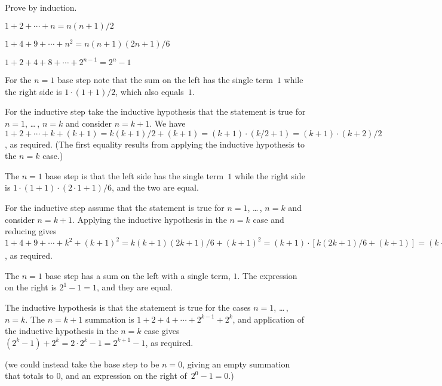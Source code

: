 \documentclass{ibl}
\begin{document}
\begin{ex}
Prove by induction.
\begin{exes}
\item $1+2+\cdots+n=n(n+1)/2$
\item $1+4+9+\cdots+n^2=n(n+1)(2n+1)/6$
\item $1+2+4+8+\cdots+2^{n-1}=2^n-1$
\end{exes}
\begin{ans}
\begin{exes}
\item For the $n=1$ base step note that the sum on the left
  has the single term~$1$
  while the right side is $1\cdot(1+1)/2$, which also equals~$1$.

  For the inductive step take the inductive hypothesis 
  that the statement is true for $n=1$, 
  \ldots\,, $n=k$ and consider $n=k+1$.
  We have 
  $1+2+\cdots+k+(k+1)=k(k+1)/2+(k+1)=(k+1)\cdot(k/2+1)=(k+1)\cdot(k+2)/2$, 
  as required.  
  (The first equality results from applying the inductive hypothesis to 
  the $n=k$ case.) 
\item The $n=1$ base step is that the left side has the single term~$1$
  while the right side is $1\cdot(1+1)\cdot(2\cdot 1+1)/6$, and the 
  two are equal.

  For the inductive step assume that the statement is true for 
  $n=1$, \ldots\,, $n=k$ and consider $n=k+1$.
  Applying the inductive hypothesis in the $n=k$ case and reducing gives
  $1+4+9+\cdots+k^2+(k+1)^2=k(k+1)(2k+1)/6+(k+1)^2
    =(k+1)\cdot [k(2k+1)/6+(k+1)]
    =(k+1)\cdot [k(2k+1)+6(k+1)]/6
    =(k+1)\cdot [2k^2+7k+6]/6
    =(k+1)(k+2)(2(k+1)+1)/6$,
  as required.

\item The $n=1$ base step has a sum on the left with a single term, $1$.
The expression on the right is $2^1-1=1$, and they are equal.

The inductive hypothesis is that 
the statement is true for the cases $n=1$, \ldots\,, $n=k$.
The $n=k+1$ summation is
$1+2+4+\cdots+2^{k-1}+2^k$, 
and application of the inductive hypothesis in the $n=k$ case gives
$(2^k-1)+2^k=2\cdot 2^k-1=2^{k+1}-1$, as required. 

(\remark we could instead take the base step to be
$n=0$, giving an empty summation that totals to $0$, and an expression
on the right of~$2^0-1=0$.)   
\end{exes}
\end{ans}
\end{ex}
\end{document}
